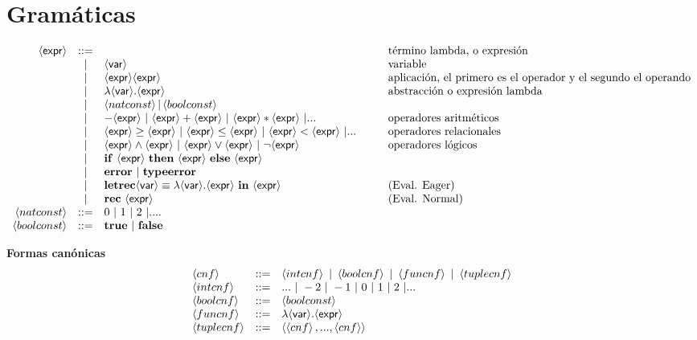   \section{Gramáticas}
    \[
      \begin{array}{rcl@{\hspace{1cm}}l}
        \expr &::= && \text{término lambda, o expresión} \\
            &|& \var & \text{variable} \\
            &|& \expr \expr & \text{aplicación, el primero es el operador y el segundo el operando} \\
            &|& \lambda \var.\expr & \text{abstracción o expresión lambda} \\
            &|& \natconst | \boolconst \\
            &|& -\expr \ |\ \expr + \expr  \ |\ \expr * \expr \ |... & \text{operadores aritméticos}\\
            &|& \expr\geq \expr  \ |\ \expr\leq \expr \ |\ \expr< \expr \ | ... & \text{operadores relacionales}\\
            &|& \expr\wedge \expr  \ |\ \expr\vee \expr \ |\ \neg\expr & \text{operadores lógicos} \\
            &|& \ife \expr\thene \expr\elsee \expr \\
            &|& \textbf{error}\ |\ \textbf{typeerror} \\
            &|& \textbf{letrec}\var \equiv \lambda \var.\expr\ \textbf{in}\ \expr&\text{(Eval. Eager)} \\
            &|& \textbf{rec}\ \expr& \text{(Eval. Normal)} \\
            \natconst & ::= & 0\ |\ 1\ |\ 2\ | .... \\
            \boolconst & ::= & \textbf{true}\ | \ \textbf{false}
      \end{array}
    \]

    \textbf{Formas canónicas}
    \[
      \begin{array}{llllll}
      \cnf & ::= & \intcnf\  |\  \boolcnf\ |\ \funcnf \ | \tuplecnf \\
      \intcnf & ::= & ...\ | \ -2\ | \ -1\ | \ 0\ |\ 1\ |\ 2\ | ... \\
      \boolcnf & ::= & \boolconst \\
      \funcnf & ::= & \lambda \var.\expr \\
      \tuplecnf & ::= & \la \la cnf \ra, ..., \la cnf \ra \ra
      \end{array}
    \]